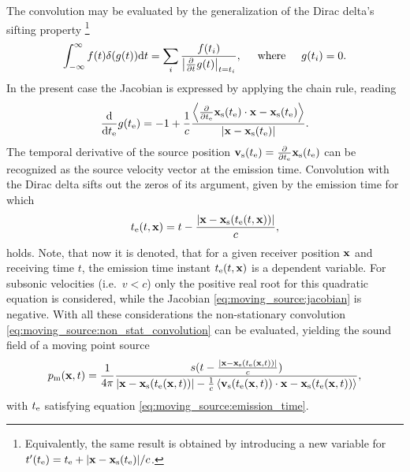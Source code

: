 The convolution may be evaluated by the generalization of the Dirac delta's sifting property \cite{Dowling1983, Crighton1992, Jackson1999}\footnote{
Equivalently, the same result is obtained by introducing a new variable for $t'(t_{\mathrm{e}}) = t_{\mathrm{e}} + |\mathbf{x}-\mathbf{x}_{\mathrm{s}}(t_{\mathrm{e}})|/c$.
}
\begin{equation}
\int_{-\infty}^{\infty} f(t) \delta(g(t)) \mathrm{d} t = \sum_{i} \frac{f(t_i)}{\left| \frac{\partial}{\partial t} g(t) \right|_{t = t_i}}, \hspace{5mm} \text{where} \hspace{5mm} g(t_i) = 0.
\end{equation}
In the present case the Jacobian is expressed by applying the chain rule, reading 
\begin{equation}
\label{eq:moving_source:jacobian}
\frac{\mathrm{d} }{\mathrm{d} t_{\mathrm{e}}} g(t_{\mathrm{e}}) = - 1 + \frac{1}{c} \frac{\left< \frac{\partial}{\partial t_{\mathrm{e}}} \mathbf{x}_{\mathrm{s}}(t_{\mathrm{e}}) \cdot \mathbf{x}-\mathbf{x}_{\mathrm{s}}(t_{\mathrm{e}})\right> }{|\mathbf{x}-\mathbf{x}_{\mathrm{s}}(t_{\mathrm{e}})|}.
\end{equation}
The temporal derivative of the source position $\mathbf{v}_{\mathrm{s}}(t_{\mathrm{e}}) = \frac{\partial}{\partial t_{\mathrm{e}}}\mathbf{x}_{\mathrm{s}}(t_{\mathrm{e}})$ can be recognized as the source velocity vector at the emission time.
Convolution with the Dirac delta sifts out the zeros of its argument, given by the emission time for which
\begin{equation}
\label{eq:moving_source:emission_time}
t_{\mathrm{e}}(t,\mathbf{x}) = t - \frac{|\mathbf{x}-\mathbf{x}_{\mathrm{s}}(t_{\mathrm{e}}(t,\mathbf{x}))|}{c},
\end{equation}
holds. 
Note, that now it is denoted, that for a given receiver position $\mathbf{x}$ and receiving time $t$, the emission time instant $t_{\mathrm{e}}(t,\mathbf{x})$ is a dependent variable.
For subsonic velocities (i.e.\ $v<c$) only the positive real root for this quadratic equation is considered, while the Jacobian \eqref{eq:moving_source:jacobian} is negative.
With all these considerations the non-stationary convolution \eqref{eq:moving_source:non_stat_convolution} can be evaluated, yielding the sound field of a moving point source
\begin{equation}
p_{\mathrm{m}}(\mathbf{x},t) =
\frac{1}{4\pi} \frac{ s(t - \frac{|\mathbf{x}-\mathbf{x}_{\mathrm{s}}(t_{\mathrm{e}}(\mathbf{x},t))|}{c} ) }{|\mathbf{x}-\mathbf{x}_{\mathrm{s}}(t_{\mathrm{e}}(\mathbf{x},t))| - \frac{1}{c}\left< \mathbf{v}_{\mathrm{s}}(t_{\mathrm{e}}(\mathbf{x},t)) \cdot \mathbf{x}-\mathbf{x}_{\mathrm{s}}(t_{\mathrm{e}}(\mathbf{x},t))\right> },
\end{equation}
with $t_{\mathrm{e}}$ satisfying equation \eqref{eq:moving_source:emission_time}.

